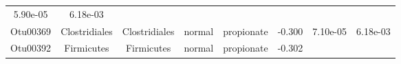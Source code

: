 \documentclass[11pt,]{article}
\begin{document}
\begin{longtable}[]{@{}cccccccc@{}}
\begin{minipage}[t]{0.08\columnwidth}
5.90e-05\strut
\end{minipage} & \begin{minipage}[t]{0.08\columnwidth}\centering\strut
6.18e-03\strut
\end{minipage}\tabularnewline
\begin{minipage}[t]{0.08\columnwidth}\centering\strut
Otu00369\strut
\end{minipage} & \begin{minipage}[t]{0.15\columnwidth}\centering\strut
Clostridiales\strut
\end{minipage} & \begin{minipage}[t]{0.15\columnwidth}\centering\strut
Clostridiales\strut
\end{minipage} & \begin{minipage}[t]{0.08\columnwidth}\centering\strut
normal\strut
\end{minipage} & \begin{minipage}[t]{0.09\columnwidth}\centering\strut
propionate\strut
\end{minipage} & \begin{minipage}[t]{0.07\columnwidth}\centering\strut
-0.300\strut
\end{minipage} & \begin{minipage}[t]{0.08\columnwidth}\centering\strut
7.10e-05\strut
\end{minipage} & \begin{minipage}[t]{0.08\columnwidth}\centering\strut
6.18e-03\strut
\end{minipage}\tabularnewline
\begin{minipage}[t]{0.08\columnwidth}\centering\strut
Otu00392\strut
\end{minipage} & \begin{minipage}[t]{0.15\columnwidth}\centering\strut
Firmicutes\strut
\end{minipage} & \begin{minipage}[t]{0.15\columnwidth}\centering\strut
Firmicutes\strut
\end{minipage} & \begin{minipage}[t]{0.08\columnwidth}\centering\strut
normal\strut
\end{minipage} & \begin{minipage}[t]{0.09\columnwidth}\centering\strut
propionate\strut
\end{minipage} & \begin{minipage}[t]{0.07\columnwidth}\centering\strut
-0.302\strut
\end{minipage} & \begin{minipage}[t]{0.08\columnwidth}\centering\strut

\end{minipage}
\end{longtable}
\end{document}
